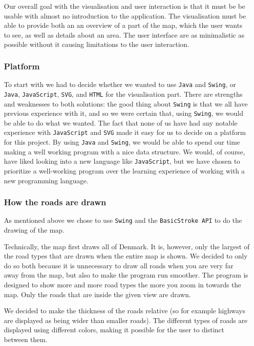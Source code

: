 Our overall goal with the visualisation and user interaction is that it must be be usable with almost no introduction to the application. The visualisation must be able to provide both an an overview of a part of the map, which the user wants to see, as well as details about an area. The user interface are as minimalistic as possible without it causing limitations to the user interaction.

\subsubsection{Platform}
To start with we had to decide whether we wanted to use \texttt{Java} and \texttt{Swing}, or \texttt{Java}, \texttt{JavaScript}, \texttt{SVG}, and \texttt{HTML} for the visualisation part. There are strengths and weaknesses to both solutions: the good thing about \texttt{Swing} is that we all have previous experience with it, and so we were certain that, using \texttt{Swing}, we would be able to do what we wanted. 
The fact that none of us have had any notable experience with \texttt{JavaScript} and \texttt{SVG} made it easy for us to decide on a platform for this project. By using \texttt{Java} and \texttt{Swing}, we would be able to spend our time making a well working program with a nice data structure. We would, of course, have liked looking into a new language like \texttt{JavaScript}, but we have chosen to prioritize a well-working program over the learning experience of working with a new programming language.

\subsubsection{How the roads are drawn}
As mentioned above we chose to use \texttt{Swing} and the \texttt{BasicStroke API} to do the drawing of the map. 

Technically, the map first draws all of Denmark. It is, however, only the largest of the road types that are drawn when the entire map is shown. We decided to only do so both because it is unnecessary to draw all roads when you are very far away from the map, but also to make the program run smoother. The program is designed to show more and more road types the more you zoom in towards the map. Only the roads that are inside the given view are drawn.

We decided to make the thickness of the roads relative (so for example highways are displayed as being wider than smaller roads). The different types of roads are displayed using different colors, making it possible for the user to distinct between them.

